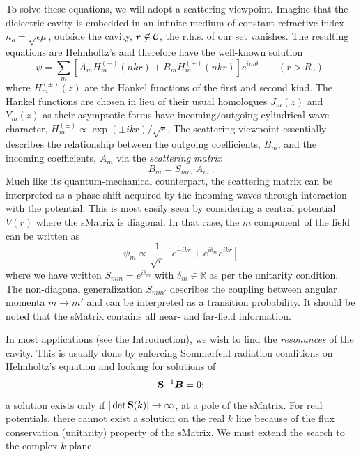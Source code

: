To solve these equations, we will adopt a scattering viewpoint. 
Imagine that the dielectric cavity is embedded in an infinite
medium of constant refractive index  $n_o=\sqrt{\epsilon\mu}$, 
outside the cavity, $\boldsymbol{r}\not\in{\mathcal{C}}$, 
the r.h.s. of our set vanishes. The resulting equations 
are Helmholtz's and therefore have the well-known solution
  \begin{equation}
    \label{eq:passive.formalism.hankelSolution}
    \psi = \sum_{m} \left[A_m H_m^{(-)}(nkr) + B_m H_m^{(+)}(nkr)\right]e^{im\theta} \qquad (r>R_0).
  \end{equation}
where $H_m^{(\pm)}(z)$ are the Hankel functions of the first
and second kind. The Hankel functions are chosen in lieu of their
usual homologues $J_m(z)$ and $Y_m(z)$ as their asymptotic forms 
have incoming/outgoing cylindrical wave character, 
$H_m^{(\pm)}\propto \exp(\pm ikr)/\sqrt{r}$. The scattering
viewpoint essentially describes the relationship between the 
outgoing coefficients, $B_m$, and the incoming coefficients, $A_m$
via the \textit{scattering matrix}
  \begin{equation}
    B_m = S_{mm'}A_{m'}. 
  \end{equation}
Much like its quantum-mechanical counterpart, the scattering
matrix can be interpreted as a phase shift acquired by the incoming
waves through interaction with the potential. This is most easily seen
by considering a central potential $V(r)$ where the \gls{sMatrix}
is diagonal. In that case, the $m$ component of the field can
be written as
  \begin{equation}
   \label{eq:passive.formalism.centralPotentialField}
   \psi_m \propto \frac{1}{\sqrt{r}}\left[e^{-ikr}+e^{i\delta_m}e^{ikr}\right]
  \end{equation}
where we have written $S_{mm}=e^{i\delta_m}$ with $\delta_m\in\mathbb{R}$ 
as per the unitarity condition. The non-diagonal
generalization $S_{mm'}$ describes the coupling between angular
momenta $m\rightarrow m'$ and can be interpreted as a transition
probability. 
It should be noted that the \gls{sMatrix} contains all near- and
far-field information. 

In most applications (see the Introduction), we wish to find the \textit{resonances} of the
cavity. This is usually done by enforcing Sommerfeld radiation conditions
on Helmholtz's equation and looking for solutions of
  \begin{equation}
   \label{eq:passive.formalism.resonanceCondition}
   \mathbf{S}^{-1}\boldsymbol{B}=0;
  \end{equation}
a solution exists only if $|\det{\mathbf{S}(k)}|\rightarrow\infty$, 
at a pole of the \gls{sMatrix}. 
For real potentials, there cannot exist a solution on the real $k$ line because
of the flux conservation (unitarity) property of the \gls{sMatrix}. We 
must extend the search to the complex $k$ plane.

